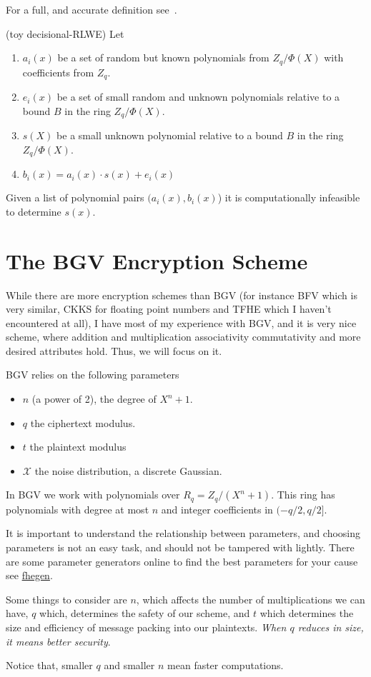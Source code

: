 For a full, and accurate definition see~\cite[def 3.3]{RLWE}.
\begin{defn} (toy decisional-RLWE)
    Let 
    \begin{enumerate}
        \item $a_i(x)$ be a set of random but known polynomials from $Z_q/\Phi(X)$ with 
        coefficients from $Z_q$.
        \item  $e_i(x)$ be a set of small random and unknown polynomials 
        relative to a bound $B$ in the ring $Z_q/\Phi(X)$.
        \item $s(X)$ be a small unknown polynomial 
        relative to a bound $B$ in the ring $Z_q/\Phi(X)$.
        \item $b_i(x)=a_i(x)\cdot s(x) + e_i(x)$
    \end{enumerate}
    
    Given a list of polynomial pairs $(a_i(x),b_i(x)$) it is computationally infeasible 
    to determine $s(x)$.
\end{defn}

\section{The BGV Encryption Scheme}

While there are more encryption schemes than BGV (for instance BFV which is very similar,
 CKKS for floating point numbers and TFHE which I haven't encountered at all),
I have most of my experience with BGV, and it is very nice scheme, 
where addition and multiplication associativity commutativity and more desired attributes 
hold.  Thus, we will focus on it.


BGV relies on the following parameters
\begin{itemize}
    \item $n$ (a power of 2), the degree of $X^n+1$.
    \item $q$ the ciphertext modulus.
    \item $t$ the plaintext modulus
    \item $\mathcal{X}$ the noise distribution, a discrete Gaussian.
\end{itemize}

In BGV we work with polynomials over $R_q=Z_q/(X^n+1)$.
This ring has polynomials with degree at most $n$ and integer coefficients in $(-q/2,q/2]$.

\begin{remark}
    It is important to understand the relationship between parameters, and choosing parameters 
    is not an easy task, and should not be tampered with lightly.
    There are some parameter generators online to find the best parameters
     for your cause see \href{https://github.com/Crypto-TII/fhegen}{fhegen}.
    
    Some things to consider are $n$, which affects the number of multiplications we can have,
    $q$ which, determines the safety of our scheme, and $t$ which determines 
    the size and efficiency of message packing into our plaintexts. 
    \emph{When $q$ reduces in size, it means better security}.    

    Notice that, smaller $q$ and smaller $n$ mean faster computations.
\end{remark}


